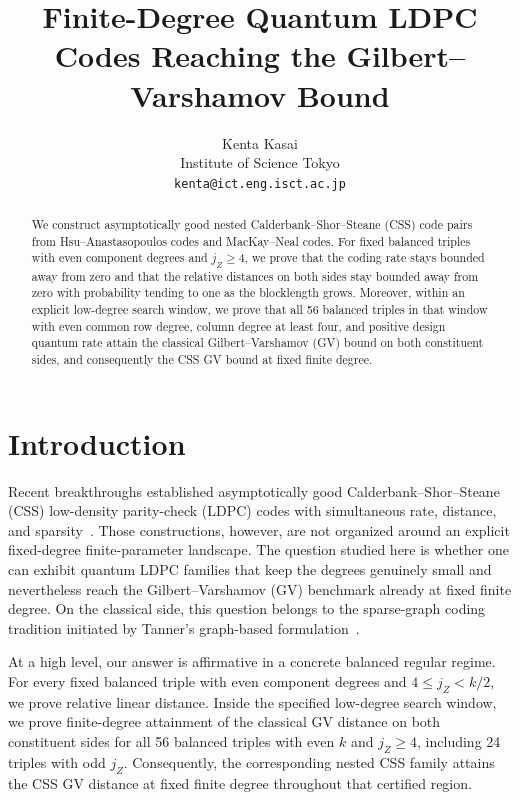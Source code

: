 \documentclass[11pt]{article}
\title{\textbf{Finite-Degree Quantum LDPC Codes Reaching the Gilbert--Varshamov Bound}}
\author{Kenta Kasai\\Institute of Science Tokyo\\ \texttt{kenta@ict.eng.isct.ac.jp}}
\date{}
\theoremstyle{definition}
\begin{document}
\maketitle

\begin{abstract}
We construct asymptotically good nested Calderbank--Shor--Steane (CSS) code pairs from Hsu--Anastasopoulos codes and MacKay--Neal codes. For fixed balanced triples with even component degrees and \(j_Z\ge4\), we prove that the coding rate stays bounded away from zero and that the relative distances on both sides stay bounded away from zero with probability tending to one as the blocklength grows. Moreover, within an explicit low-degree search window, we prove that all 56 balanced triples in that window with even common row degree, column degree at least four, and positive design quantum rate attain the classical Gilbert--Varshamov (GV) bound on both constituent sides, and consequently the CSS GV bound at fixed finite degree.
\end{abstract}

\section{Introduction}

Recent breakthroughs established asymptotically good Calderbank--Shor--Steane (CSS) low-density parity-check (LDPC) codes with simultaneous rate, distance, and sparsity~\cite{PK21,DHLV22,LZ22}. Those constructions, however, are not organized around an explicit fixed-degree finite-parameter landscape. The question studied here is whether one can exhibit quantum LDPC families that keep the degrees genuinely small and nevertheless reach the Gilbert--Varshamov (GV) benchmark already at fixed finite degree. On the classical side, this question belongs to the sparse-graph coding tradition initiated by Tanner's graph-based formulation~\cite{Tanner81}.

At a high level, our answer is affirmative in a concrete balanced regular regime. For every fixed balanced triple with even component degrees and \(4\le j_Z<k/2\), we prove relative linear distance. Inside the specified low-degree search window, we prove finite-degree attainment of the classical GV distance on both constituent sides for all 56 balanced triples with even \(k\) and \(j_Z\ge4\), including 24 triples with odd \(j_Z\). Consequently, the corresponding nested CSS family attains the CSS GV distance at fixed finite degree throughout that certified region.
\end{document}
